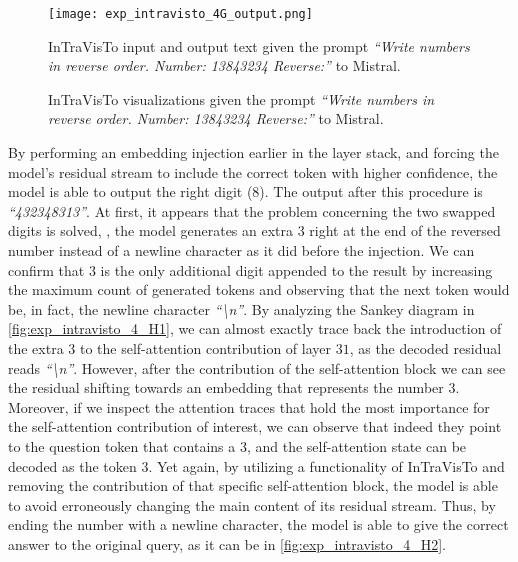 \begin{figure}[t!]
    \centering
    \texttt{[image: exp\_intravisto\_4G\_output.png]}
    \caption{InTraVisTo input and output text given the prompt \emph{``Write numbers in reverse order. Number: 13843234 Reverse:''} to Mistral.}
    \label{fig:exp_intravisto_4_G1}
\end{figure}

\begin{figure}[t!]
    \centering
    \quad
    \caption{InTraVisTo visualizations given the prompt \emph{``Write numbers in reverse order. Number: 13843234 Reverse:''} to Mistral.}
    \label{fig:exp_intravisto_4_G}
\end{figure}

By performing an embedding injection earlier in the layer stack, and forcing the model's residual stream to include the correct token with higher confidence, the model is  able to output the right digit ($8$).
The output after this procedure is \emph{``432348313''}.
At first, it appears that the problem concerning the two swapped digits is solved, , the model generates an extra $3$ right at the end of the reversed number instead of a newline character as it did before the injection.
We can confirm that $3$ is the only additional digit appended to the result by increasing the maximum count of generated tokens and observing that the next token would be, in fact, the newline character \emph{``\textbackslash{}n''}.
By analyzing the Sankey diagram in \cref{fig:exp_intravisto_4_H1}, we can almost exactly trace back the introduction of the extra $3$ to the self-attention contribution of layer $31$, as  the decoded residual reads \emph{``\textbackslash{}n''}.
However, after the contribution of the  self-attention block we can see the residual shifting towards an embedding that represents the number $3$.
Moreover, if we inspect the attention traces that hold the most importance for the self-attention contribution of interest, we can observe that indeed they point to the question token that contains a $3$, and the self-attention state  can be decoded as the token $3$.
Yet again, by utilizing a functionality of InTraVisTo and removing the contribution of that specific self-attention block, the model is able to avoid erroneously changing the main content of its residual stream.
Thus, by ending the number with a newline character, the model is able to give the correct answer to the original query, as it can be  in \cref{fig:exp_intravisto_4_H2}.

